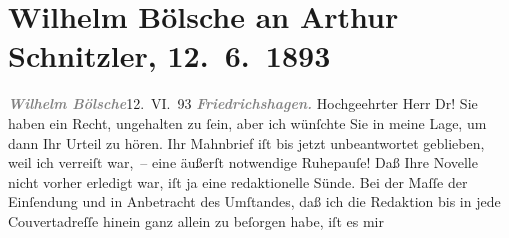 

         
         \renewcommand{\erwaehntePersonen}{Personen: Wilhelm Bölsche, Cesare Lombroso}
         \renewcommand{\erwaehnteOrte}{Orte: Berlin, Friedrichshagen, Wien}
         \renewcommand{\erwaehnteWerke}{Werke: Das Weib als Verbrecherin und Prostituierte. Anthropologische Studien, gegründet auf eine Darstellung der Biologie und Psychologie des normalen Weibes., Die Braut}
               \section[Wilhelm Bölsche an Arthur Schnitzler, 12. 6. 1893]{ Wilhelm Bölsche an Arthur Schnitzler, 12. 6. 1893}\nopagebreak{}\rehead{ }\begin{ledgroupsized}[t]{13cm}\normalsize\beginnumbering{} \toendnotes[C]{\smallbreak\pagebreak[2]} 
\toendnotes[C]{\smallbreak}\pstart
           {\pb}\textcolor{gray}{\textbf{\textit{Wilhelm Bölsche}}}\hfill 12. VI. 93\pend
           \pstart
           \textcolor{gray}{\textbf{\textit{Friedrichshagen.}}}\pend
           \pstart{}Hochgeehrter Herr Dr!\pend\pstart
           Sie haben ein Recht, ungehalten zu ſein, aber ich wünſchte Sie in meine Lage, um dann
               Ihr Urteil zu hören. Ihr Mahnbrief iſt bis jetzt unbeantwortet geblieben, weil ich
               verreiſt war, – eine äußerſt notwendige Ruhepauſe! Daß Ihre Novelle nicht vorher erledigt war, iſt ja eine redaktionelle
               Sünde. Bei der Maſſe der Einſendung und in Anbetracht des Umſtandes, daß ich die
               Redaktion bis in jede Couvertadreſſe hinein ganz allein zu beſorgen habe, iſt es mir

\end{ledgroupsized}

